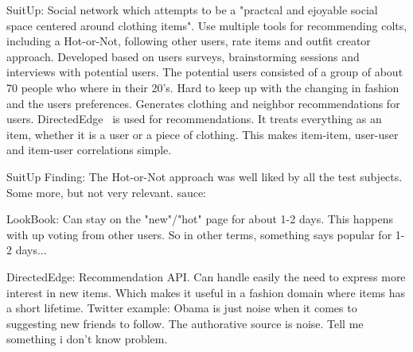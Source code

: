 SuitUp:
Social network which attempts to be a "practcal and ejoyable social space centered around clothing items".
Use multiple tools for recommending colts, including a Hot-or-Not, following other users, rate items and outfit creator approach.
Developed based on users surveys, brainstorming sessions and interviews with potential users.
The potential users consisted of a group of about 70 people who where in their 20's.
Hard to keep up with the changing in fashion and the users preferences.
Generates clothing and neighbor recommendations for users.
DirectedEdge~\cite{direcetedEdge} is used for recommendations.
It treats everything as an item, whether it is a user or a piece of clothing.
This makes item-item, user-user and item-user correlations simple.

SuitUp Finding:
The Hot-or-Not approach was well liked by all the test subjects.
Some more, but not very relevant.
sauce:\cite{SuitUp}

LookBook:
Can stay on the "new"/"hot" page for about 1-2 days.
This happens with up voting from other users.
So in other terms, something says popular for 1-2 days...

DirectedEdge:
Recommendation API.
Can handle easily the need to express more interest in new items.
Which makes it useful in a fashion domain where items has a short lifetime.
Twitter example:
Obama is just noise when it comes to suggesting new friends to follow.
The authorative source is noise.
Tell me something i don't know problem.








